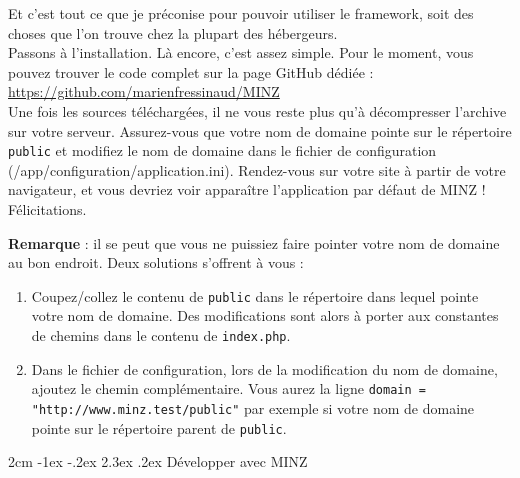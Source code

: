 \documentclass[a4paper,11pt]{article}
\makeatletter
\renewcommand\section{\@startsection{section}{1}{\z@}%
	{2cm \@plus -1ex \@minus -.2ex}%
	{2.3ex \@plus.2ex}%
	{\color{bleuClair}\reset@font\Large\bfseries}}
\makeatother
\begin{document}
Et c'est tout ce que je préconise pour pouvoir utiliser le framework, soit des choses que l'on trouve chez la plupart des hébergeurs.\\

Passons à l'installation. Là encore, c'est assez simple. Pour le moment, vous pouvez trouver le code complet sur la page GitHub dédiée :\\ \url{https://github.com/marienfressinaud/MINZ}\\

Une fois les sources téléchargées, il ne vous reste plus qu'à décompresser l'archive sur votre serveur. Assurez-vous que votre nom de domaine pointe sur le répertoire \texttt{public} et modifiez le nom de domaine dans le fichier de configuration (/app/configuration/application.ini). Rendez-vous sur votre site à partir de votre navigateur, et vous devriez voir apparaître l'application par défaut de MINZ ! Félicitations.\\

\textcolor{grisFonce}{\textbf{Remarque} : il se peut que vous ne puissiez faire pointer votre nom de domaine au bon endroit. Deux solutions s'offrent à vous :
\begin{enumerate}
  \item Coupez/collez le contenu de \texttt{public} dans le répertoire dans lequel pointe votre nom de domaine. Des modifications sont alors à porter aux constantes de chemins dans le contenu de \texttt{index.php}.
  \item Dans le fichier de configuration, lors de la modification du nom de domaine, ajoutez le chemin complémentaire. Vous aurez la ligne \texttt{domain = "http://www.minz.test/public"} par exemple si votre nom de domaine pointe sur le répertoire parent de \texttt{public}.
\end{enumerate}
}

\newpage

\section{Développer avec MINZ}
\end{document}
